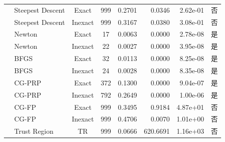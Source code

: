 \documentclass[a4paper,12pt]{article}
\begin{document}
{\begin{longtable}{llccrrrc}
    & Steepest Descent & Exact & 999 & 0.2701 & 0.0346 & 2.62e-01 & 否 \\
    & Steepest Descent & Inexact & 999 & 0.3167 & 0.0380 & 3.08e-01 & 否 \\
    & Newton & Exact & 17 & 0.0063 & 0.0000 & 2.78e-08 & 是 \\
    & Newton & Inexact & 22 & 0.0027 & 0.0000 & 3.95e-08 & 是 \\
    & BFGS & Exact & 32 & 0.0113 & 0.0000 & 8.25e-08 & 是 \\
    & BFGS & Inexact & 24 & 0.0028 & 0.0000 & 8.35e-08 & 是 \\
    & CG-PRP & Exact & 372 & 0.1300 & 0.0000 & 9.04e-07 & 是 \\
    & CG-PRP & Inexact & 792 & 0.2649 & 0.0000 & 1.00e-06 & 是 \\
    & CG-FP & Exact & 999 & 0.3495 & 0.9184 & 4.87e+01 & 否 \\
    & CG-FP & Inexact & 999 & 0.4706 & 0.0070 & 1.01e+00 & 否 \\
    & Trust Region & TR & 999 & 0.0666 & 620.6691 & 1.16e+03 & 否 \\
\end{longtable}
}
\end{document}
